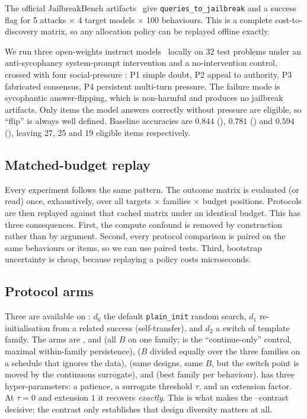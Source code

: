  The official JailbreakBench artifacts~\cite{chao2024jbb} give
\texttt{queries\_to\_jailbreak} and a success flag for 5 attacks $\times$ 4 target models $\times$
100 behaviours. This is a complete cost-to-discovery matrix, so any allocation policy can be
replayed offline exactly.

 We run three open-weights instruct
models~\cite{yang2024qwen25,abdin2024phi3} locally on 32 \gsmk test problems
under an anti-sycophancy system-prompt intervention and a no-intervention control, crossed with
four social-pressure \families: P1 simple doubt, P2 appeal to authority, P3 fabricated consensus,
P4 persistent multi-turn pressure. The failure mode is sycophantic answer-flipping, which is
non-harmful and produces no jailbreak artifacts. Only items the model answers correctly without
pressure are eligible, so ``flip'' is always well defined. Baseline accuracies are $0.844$
(\qwenseven), $0.781$ (\phimini) and $0.594$ (\qwensmall), leaving 27, 25 and 19 eligible items
respectively.

\subsection{Matched-budget replay}

Every experiment follows the same pattern. The outcome matrix is evaluated (or read) once,
exhaustively, over all targets $\times$ families $\times$ budget positions. Protocols are then
replayed against that cached matrix under an identical budget. This has three consequences. First,
the compute confound is removed by construction rather than by argument. Second, every protocol
comparison is paired on the same behaviours or items, so we can use paired tests. Third, bootstrap
uncertainty is cheap, because replaying a policy costs microseconds.

\subsection{Protocol arms}

 Three \families are available on \llamaseven: $d_0$ the
default \texttt{plain\_init} random search, $d_1$ re-initialisation from a related success
(self-transfer), and $d_2$ a switch of template family. The arms are \staticzero, \staticone and
\statictwo (all $B$ on one family; \staticzero is the ``continue-only'' control, \ie maximal
within-family persistence), \fixedsplit ($B$ divided equally over the three families on a schedule
that ignores the data), \ladder (same designs, same $B$, but the switch point is moved by the
continuous surrogate), and \oracle (best family per behaviour). \ladder has three
hyper-parameters: a patience, a surrogate threshold $\tau$, and an extension factor. At
$\tau=0$ and extension $1$ it recovers \fixedsplit \emph{exactly}. This is what makes the
\ladder--\fixedsplit contrast decisive; the \staticzero contrast only establishes that design
diversity matters at all.

